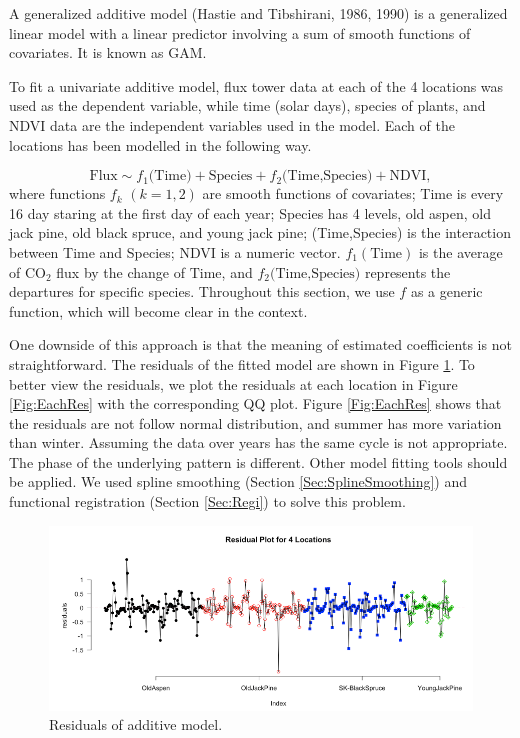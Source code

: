 \documentclass{article}
\begin{document}
A generalized additive model (Hastie and Tibshirani, 1986, 1990) is a generalized linear model with a linear predictor involving a sum of smooth functions of covariates. It is known as GAM. 

To fit a univariate additive model, flux tower data at each of the 4 locations was used as the dependent variable,  while time (solar days), species of plants, and NDVI data are the independent variables used in the model.  Each of the locations has been modelled in the following way.

\begin{equation}
\textrm{Flux} \sim f_1\textrm{(Time)} + \textrm{Species}  + f_2\textrm{(Time,Species)} + \textrm{NDVI},\label{Eq:AddMod}
\end{equation}
where functions $f_k$  $(k=1,2)$ are smooth functions of covariates; Time is every 16 day staring at the first day of each year; Species has 4 levels, old aspen, old jack pine, old black spruce, and young jack pine; (Time,Species) is the interaction between Time and Species; NDVI is a numeric vector. $f_1(\textrm{Time})$ is the average of CO$_2$ flux by the change of $\textrm{Time}$, and $f_2\textrm{(Time,Species)}$ represents the departures for specific species. Throughout this section, we use $f$ as a generic function, which will become clear in the context.

One downside of this approach is that the meaning of estimated coefficients is not straightforward. The residuals of the fitted model are shown in Figure \ref{Fig:GAM}. To better view the residuals, we plot the residuals at each location in Figure \ref{Fig:EachRes} with the corresponding QQ plot. Figure \ref{Fig:EachRes} shows that the residuals are not follow normal distribution, and summer has more variation than winter. Assuming the data over years has the same cycle is not appropriate. The phase of the underlying pattern is different. Other model fitting tools should be applied.  We used spline smoothing (Section \ref{Sec:SplineSmoothing})  and functional registration (Section \ref{Sec:Regi}) to solve this problem.

\begin{figure}[!ht]
\centering
\includegraphics[width=14cm]{res3.png}
\caption{Residuals of additive model.}\label{Fig:GAM}
\end{figure}
\end{document}
